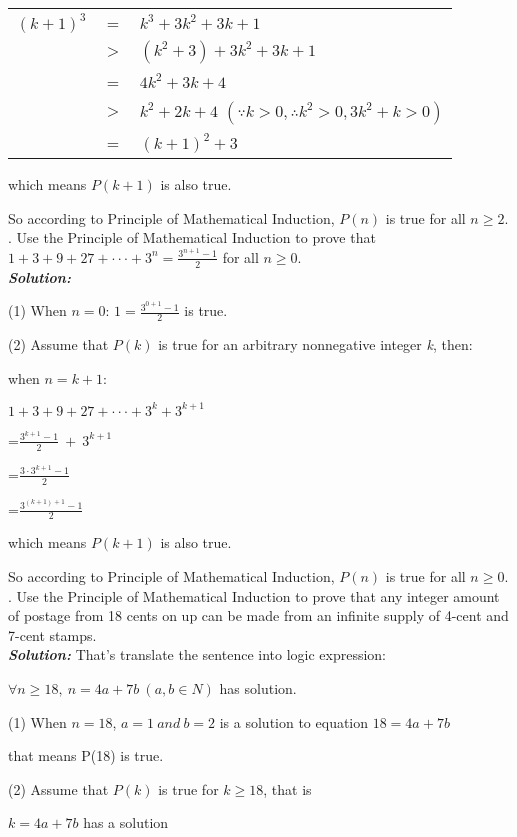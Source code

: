 \documentclass[11pt, oneside]{article}   	%
\begin{document}
\begin{tabular}{@{} rcl @{}}
$(k+1)^{3}$&=&$k^{3}+3k^{2}+3k+1$\\
&$>$&$(k^{2}+3)+3k^{2}+3k+1$\\
&=&$4k^{2}+3k+4$\\
&$>$&$k^{2}+2k+4$ \quad $(\because k>0, \therefore k^{2}>0, 3k^{2}+k>0)$\\
&=&$(k+1)^{2}+3$
\end{tabular}

which means $P(k+1)$ is also true.

So according to Principle of Mathematical Induction, $P(n)$ is true for all $n\ge 2$.\\

. Use the Principle of Mathematical Induction to prove that $1+3+9+27+\cdot\cdot\cdot+3^{n}=\frac{3^{n+1}-1}{2}$ for all $n\ge 0$.\\
\textbf{\emph{Solution:}}

(1) When $n=0$: $1=\frac{3^{0+1}-1}{2}$ is true.

(2) Assume that $P(k)$ is true for an arbitrary nonnegative integer \emph{k}, then:

when $n=k+1$:

$1+3+9+27+\cdot\cdot\cdot+3^{k}+3^{k+1}$

=$\frac{3^{k+1}-1}{2}\ +\ 3^{k+1}$

=$\frac{3\cdot 3^{k+1}-1}{2}$

=$\frac{3^{(k+1)+1}-1}{2}$

which means $P(k+1)$ is also true.

So according to Principle of Mathematical Induction, $P(n)$ is true for all $n\ge 0$.\\

. Use the Principle of Mathematical Induction to prove that any integer amount of postage from 18 cents on up can be made from an infinite supply of 4-cent and 7-cent stamps.\\
\textbf{\emph{Solution:}} That's translate the sentence into logic expression:

$\forall n\ge 18,\ n=4a+7b\ (a,b\in N)$  has solution.

(1) When $n=18$, $a=1\ and\ b=2$ is a solution to equation $18=4a+7b$

that means P(18) is true.

(2) Assume that $P(k)$ is true for $k\ge18$, that is

\indent \qquad $k=4a+7b$ has a solution
\end{document}
